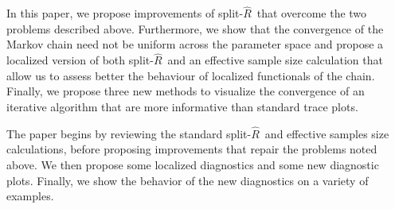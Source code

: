 \documentclass[american,]{article}
\newcommand{\sRhat}{split-$\widehat{R}$}
\begin{document}
In this paper, we propose improvements of 
\sRhat\ that overcome the two 
problems described above. Furthermore, we show that the convergence
of the Markov chain need not be uniform across the parameter space
and propose a localized version of both \sRhat\ and an effective sample size 
calculation that allow us to assess better the behaviour of localized 
functionals of the chain. Finally, we propose three new methods to visualize the 
convergence of an iterative algorithm that are more informative than standard 
trace plots.

The paper begins by reviewing the standard \sRhat\ and effective samples size calculations, before proposing improvements that repair the problems noted above. We then propose some localized diagnostics and some new diagnostic plots. Finally, we show the behavior of the new diagnostics on a variety of examples.

  
\end{document}
